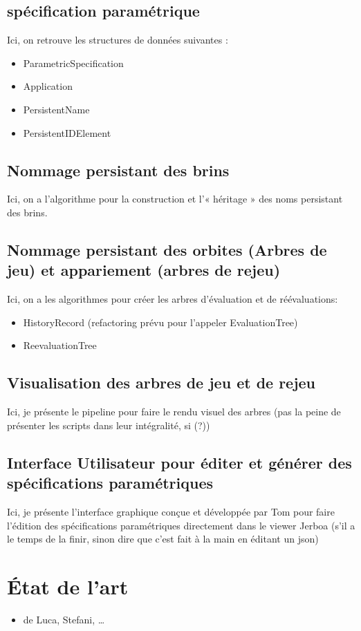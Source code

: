 \documentclass[11pt]{article}
\begin{document}
\subsection{spécification paramétrique}
\label{sec:org08a673d}
Ici, on retrouve les structures de données suivantes :
\begin{itemize}
\item ParametricSpecification
\item Application
\item PersistentName
\item PersistentIDElement
\end{itemize}
\subsection{Nommage persistant des brins}
\label{sec:orgc87393b}
Ici, on a l'algorithme pour la construction et l'« héritage » des noms persistant des brins.
\subsection{Nommage persistant des orbites (Arbres de jeu) et appariement (arbres de rejeu)}
\label{sec:org9115aaa}
Ici, on a les algorithmes pour créer les arbres d'évaluation et de réévaluations:
\begin{itemize}
\item HistoryRecord (refactoring prévu pour l'appeler EvaluationTree)
\item ReevaluationTree
\end{itemize}
\subsection{Visualisation des arbres de jeu et de rejeu}
\label{sec:org671ef41}
Ici, je présente le pipeline pour faire le rendu visuel des arbres (pas la peine de présenter les scripts dans leur intégralité, si (?))
\subsection{Interface Utilisateur pour éditer et générer des spécifications paramétriques}
\label{sec:org610bb25}
Ici, je présente l'interface graphique conçue et développée par Tom pour faire
l'édition des spécifications paramétriques directement dans le viewer Jerboa (s'il a le
temps de la finir, sinon dire que c'est fait à la main en éditant un json)
\section{État de l'art}
\label{sec:orge1f24b9}
\begin{itemize}
\item de Luca, Stefani, …
\end{itemize}
\end{document}
